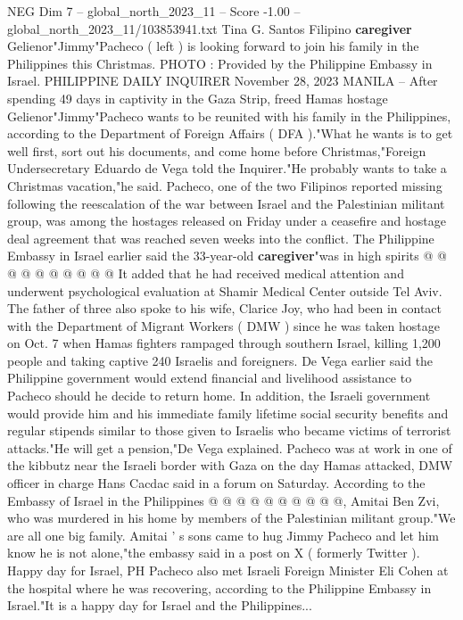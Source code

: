 \begin{textsample}{NEG Dim 7 – global\_north\_2023\_11 – Score -1.00 – global\_north\_2023\_11/103853941.txt}  \label{ex:f7_neg_326}
Tina G.
Santos Filipino \textbf{caregiver} Gelienor"Jimmy"Pacheco ( left ) is looking forward to join his family in the Philippines this Christmas.
PHOTO : Provided by the Philippine Embassy in Israel.
PHILIPPINE DAILY INQUIRER November 28, 2023 MANILA -- After spending 49 days in captivity in the Gaza Strip, freed Hamas hostage Gelienor"Jimmy"Pacheco wants to be reunited with his family in the Philippines, according to the Department of Foreign Affairs ( DFA )."What he wants is to get well first, sort out his documents, and come home before Christmas,"Foreign Undersecretary Eduardo de Vega told the Inquirer."He probably wants to take a Christmas vacation,"he said.
Pacheco, one of the two Filipinos reported missing following the reescalation of the war between Israel and the Palestinian militant group, was among the hostages released on Friday under a ceasefire and hostage deal agreement that was reached seven weeks into the conflict.
The Philippine Embassy in Israel earlier said the 33-year-old \textbf{caregiver}"was in high spirits @ @ @ @ @ @ @ @ @ @ It added that he had received medical attention and underwent psychological evaluation at Shamir Medical Center outside Tel Aviv.
The father of three also spoke to his wife, Clarice Joy, who had been in contact with the Department of Migrant Workers ( DMW ) since he was taken hostage on Oct. 7 when Hamas fighters rampaged through southern Israel, killing 1,200 people and taking captive 240 Israelis and foreigners.
De Vega earlier said the Philippine government would extend financial and livelihood assistance to Pacheco should he decide to return home.
In addition, the Israeli government would provide him and his immediate family lifetime social security benefits and regular stipends similar to those given to Israelis who became victims of terrorist attacks."He will get a pension,"De Vega explained.
Pacheco was at work in one of the kibbutz near the Israeli border with Gaza on the day Hamas attacked, DMW officer in charge Hans Cacdac said in a forum on Saturday.
According to the Embassy of Israel in the Philippines @ @ @ @ @ @ @ @ @ @, Amitai Ben Zvi, who was murdered in his home by members of the Palestinian militant group."We are all one big family.
Amitai ' s sons came to hug Jimmy Pacheco and let him know he is not alone,"the embassy said in a post on X ( formerly Twitter ).
Happy day for Israel, PH Pacheco also met Israeli Foreign Minister Eli Cohen at the hospital where he was recovering, according to the Philippine Embassy in Israel."It is a happy day for Israel and the Philippines...

\end{textsample}
